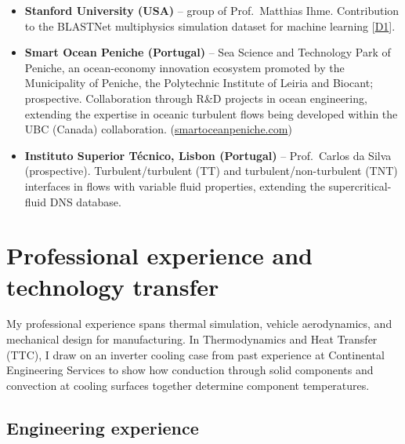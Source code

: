 \documentclass[11pt]{article}
\newcommand{\NEW}[1]{\iffinal #1\else{\color{red}#1}\fi} %
\begin{document}
\begin{itemize}
  application of non-stationary transfer-entropy frameworks to extreme wall-heat-flux events
  in supercritical fluid flows.
  \item \textbf{Stanford University (USA)} -- group of Prof.\ Matthias Ihme. Contribution
  to the BLASTNet multiphysics simulation dataset for machine learning [\hyperlink{pub-D1}{D1}].
  \item \textbf{Smart Ocean Peniche (Portugal)} -- Sea Science and Technology Park
  of Peniche, an ocean-economy innovation ecosystem promoted by the Municipality of
  Peniche, the Polytechnic Institute of Leiria and Biocant\NEW{; prospective}.
  Collaboration through R\&D projects in ocean engineering, extending the expertise in oceanic turbulent flows \NEW{being} developed within the UBC (Canada) collaboration.
  (\href{https://smartoceanpeniche.com}{smartoceanpeniche.com})
  \item \textbf{Instituto Superior T{\'e}cnico, Lisbon (Portugal)} -- Prof.\ Carlos da Silva
  (prospective). Turbulent/turbulent (TT) and turbulent/non-turbulent (TNT) interfaces in
  flows with variable fluid properties, extending the supercritical-fluid DNS database.
\end{itemize}

\section{Professional experience and technology transfer}\label{sec:prof}

My professional experience spans thermal simulation, vehicle aerodynamics, and mechanical design for manufacturing. In Thermodynamics and Heat Transfer (TTC), I draw on an inverter cooling case from past experience at Continental Engineering Services to show how conduction through solid components and convection at cooling surfaces together determine component temperatures.

\subsection{Engineering experience}
\end{document}
